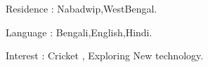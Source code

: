 \documentclass{deedy-resume-openfont}
\begin{document}
\begin{minipage}[t]{0.66\textwidth}
\begin{tightemize}
\item Residence : Nabadwip,WestBengal.
\item  Language : Bengali,English,Hindi.
\item  Interest : Cricket , Exploring New technology.


\end{tightemize}
\sectionsep







\renewcommand\refname{\vskip -1.5em} %

\nocite{*}

\end{minipage} 
\end{document}
